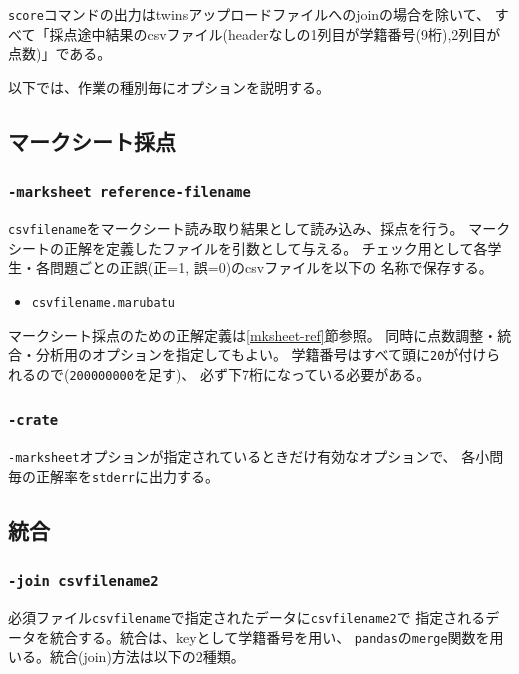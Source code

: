 \texttt{score}コマンドの出力はtwinsアップロードファイルへのjoinの場合を除いて、
すべて「採点途中結果のcsvファイル(headerなしの1列目が学籍番号(9桁),2列目が点数)」である。

以下では、作業の種別毎にオプションを説明する。

\subsection{マークシート採点}
\label{マークシート採点}

\subsubsection{\texttt{-marksheet reference-filename}}
\label{-marksheetreference-filename}

\texttt{csvfilename}をマークシート読み取り結果として読み込み、採点を行う。
マークシートの正解を定義したファイルを引数として与える。
チェック用として各学生・各問題ごとの正誤(正=1, 誤=0)のcsvファイルを以下の
名称で保存する。

\begin{itemize}
\item \texttt{csvfilename.marubatu}

\end{itemize}

マークシート採点のための正解定義は\ref{mksheet-ref}節参照。
同時に点数調整・統合・分析用のオプションを指定してもよい。
学籍番号はすべて頭に\texttt{20}が付けられるので(\texttt{200000000}を足す)、
必ず下7桁になっている必要がある。

\subsubsection{\texttt{-crate}}
\label{-crate}

\texttt{-marksheet}オプションが指定されているときだけ有効なオプションで、
各小問毎の正解率を\texttt{stderr}に出力する。

\subsection{統合}
\label{統合}

\subsubsection{\texttt{-join csvfilename2}}
\label{-joincsvfilename2}

必須ファイル\texttt{csvfilename}で指定されたデータに\texttt{csvfilename2}で
指定されるデータを統合する。統合は、keyとして学籍番号を用い、
\texttt{pandas}の\texttt{merge}関数を用いる。統合(join)方法は以下の2種類。

